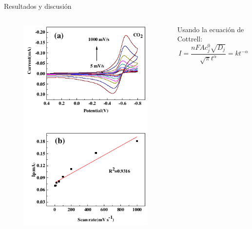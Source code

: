 \documentclass[handout]{beamer}
\begin{document}
\begin{frame}{Resultados y discusi\'on}
	\begin{columns}
		\begin{column}{0.4\textwidth}
			\begin{figure}[h]
				\centering
				\includegraphics[width=\linewidth]{sources/scan}
			\end{figure}
		\end{column}
		\begin{column}{0.6\textwidth}
			Usando la ecuaci\'on de Cottrell:
			\begin{equation}
				I = \dfrac{nFAc_j^0\sqrt{D_j}}{\sqrt{\pi}t^\alpha} = kt^{-\alpha}
			\end{equation}

\end{column}
\end{columns}
\end{frame}
\end{document}
